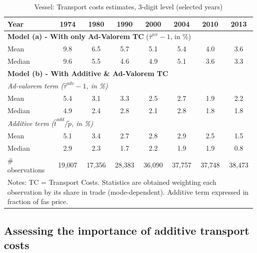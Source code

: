 \documentclass[a4paper,11pt]{article}
\begin{document}
\begin{table}[htbp]
  \centering
  \caption{Vessel: Transport costs estimates, 3-digit level (selected years)}
\begin{center}
    \begin{tabular}{l|ccccccc}
   \hline\hline
Year         & 1974  & 1980  & 1990  & 2000  & 2004 & 2010  & 2013   \\
 \hline
   \multicolumn{8}{l}{\textbf{Model (a) - With only Ad-Valorem TC} ($\widehat{\tau}^{ice}-1$, in \%)}  \\
   \hline
Mean  & 9.8 & 6.5 & 5.7 & 5.1 & 5.4 & 4.0 & 3.6  \\
Median & 9.6 & 5.5 & 4.6 & 4.9 & 5.1  & 3.6 & 3.3  \\
\hline
\multicolumn{8}{l}{\textbf{Model (b) - With Additive \& Ad-Valorem TC}}    \\
\hline
\multicolumn{8}{l}{\textit{Ad-valorem term ($\widehat{\tau}^{adv}-1$, in \%)} } \\
\hline
Mean  & 5.4 & 3.1 & 3.3 & 2.5 & 2.7 & 1.9 & 2.2 \\
Median & 4.9 & 2.4 & 2.8 & 2.1 & 2.8 & 1.8 & 1.8  \\
\hline
\multicolumn{8}{l}{\textit{Additive term ($\widehat{t}^{add}/\widetilde{p}$, in \%)}}  \\
\hline
Mean  & 5.1 & 3.4 & 2.7 & 2.8 & 2.9 & 2.5 & 1.5  \\
Median & 2.9 & 2.3 & 1.7 & 2.2 & 1.9 & 1.9 & 0.8 \\
\hline
 \# observations & 19,007 & 17,356 & 28,383 & 36,090 & 37,757 & 37,748 & 38,473 \\
\hline\hline
\multicolumn{8}{l}{\parbox[l]{15cm}{ \vspace{7pt}\footnotesize{Notes: TC = Transport Costs.
Statistics are obtained weighting each observation by its share in trade (mode-dependent).
Additive term expressed in fraction of fas price.}}}
\end{tabular}%
\end{center} \label{tab:result_ves_3d_detail}
\end{table}%


\subsection{Assessing the importance of additive transport costs \label{app:diagnostic_test}}
\end{document}
